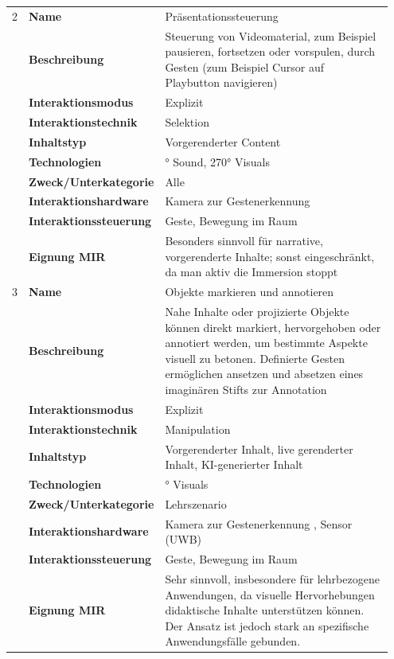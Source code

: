 \begin{longtable}{p{0.03\linewidth} p{0.27\linewidth}
    >{\raggedright\arraybackslash}p{0.65\linewidth}}
    2   & \textbf{Name} & Präsentationssteuerung \\
        & \textbf{Beschreibung} & Steuerung von Videomaterial, zum Beispiel pausieren, fortsetzen oder vorspulen, durch Gesten (zum Beispiel Cursor auf Playbutton navigieren) \\
        & \textbf{Interaktionsmodus} & Explizit \\
        & \textbf{Interaktionstechnik} & Selektion \\
        & \textbf{Inhaltstyp} & Vorgerenderter Content \\
        & \textbf{Technologien} & 360° Sound, 270° Visuals \\
        & \textbf{Zweck/Unterkategorie} & Alle \\
        & \textbf{Interaktionshardware} & Kamera zur Gestenerkennung \\
        & \textbf{Interaktionssteuerung} & Geste, Bewegung im Raum \\
        & \textbf{Eignung MIR} & Besonders sinnvoll für narrative, vorgerenderte Inhalte; sonst eingeschränkt, da man aktiv die Immersion stoppt  \\
        \midrule

    3   & \textbf{Name} & Objekte markieren und annotieren \\
        & \textbf{Beschreibung} & Nahe Inhalte oder projizierte Objekte können direkt markiert, hervorgehoben oder annotiert werden, um bestimmte Aspekte visuell zu betonen. Definierte Gesten ermög\-lichen ansetzen und absetzen eines imaginären Stifts zur Annotation \\
        & \textbf{Interaktionsmodus} & Explizit \\
        & \textbf{Interaktionstechnik} & Manipulation \\
        & \textbf{Inhaltstyp} & Vorgerenderter Inhalt, live gerenderter Inhalt, KI-generierter Inhalt \\
        & \textbf{Technologien} & 270° Visuals \\
        & \textbf{Zweck/Unterkategorie} & Lehrszenario \\
        & \textbf{Interaktionshardware} & Kamera zur Gestenerkennung , Sensor (UWB)\\
        & \textbf{Interaktionssteuerung} & Geste, Bewegung im Raum \\
        & \textbf{Eignung MIR} & Sehr sinnvoll, insbesondere für lehrbezogene Anwendungen, da visuelle Hervorhebungen didaktische Inhalte unterstützen können. Der Ansatz ist jedoch stark an spezifische Anwendungsfälle gebunden. \\
        \midrule


\end{longtable}
